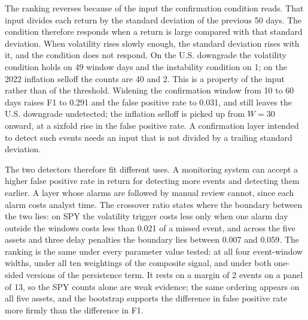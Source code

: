 \documentclass[pdflatex,sn-mathphys-num,iicol]{sn-jnl}
\begin{document}
The ranking reverses because of the input the confirmation condition reads. That input divides each return by the standard deviation of the previous 50 days. The condition therefore responds when a return is large compared with that standard deviation. When volatility rises slowly enough, the standard deviation rises with it, and the condition does not respond. On the U.S. downgrade the volatility condition holds on 49 window days and the instability condition on 1; on the 2022 inflation selloff the counts are 40 and 2. This is a property of the input rather than of the threshold. Widening the confirmation window from 10 to 60 days raises F1 to 0.291 and the false positive rate to 0.031, and still leaves the U.S. downgrade undetected; the inflation selloff is picked up from $W=30$ onward, at a sixfold rise in the false positive rate. A confirmation layer intended to detect such events needs an input that is not divided by a trailing standard deviation.

The two detectors therefore fit different uses. A monitoring system can accept a higher false positive rate in return for detecting more events and detecting them earlier. A layer whose alarms are followed by manual review cannot, since each alarm costs analyst time. The crossover ratio states where the boundary between the two lies: on SPY the volatility trigger costs less only when one alarm day outside the windows costs less than 0.021 of a missed event, and across the five assets and three delay penalties the boundary lies between 0.007 and 0.059. The ranking is the same under every parameter value tested: at all four event-window widths, under all ten weightings of the composite signal, and under both one-sided versions of the persistence term. It rests on a margin of 2 events on a panel of 13, so the SPY counts alone are weak evidence; the same ordering appears on all five assets, and the bootstrap supports the difference in false positive rate more firmly than the difference in F1.
\end{document}
